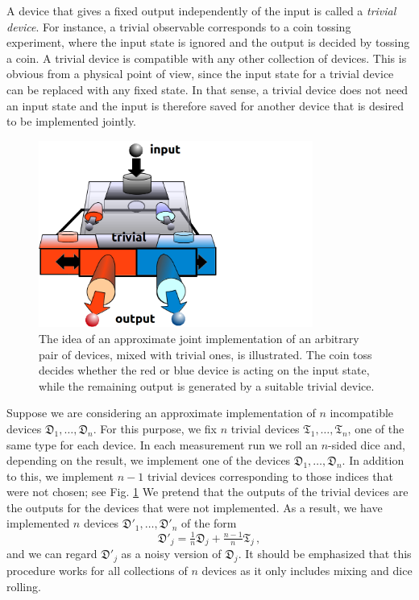 \documentclass[12pt]{iopart}
\theoremstyle{definition}
\newcommand{\Dev}{\mathfrak{D}} %
\newcommand{\Triv}{\mathfrak{T}} %
\begin{document}
A device that gives a fixed output independently of the input is called a \emph{trivial device}.
For instance, a trivial observable corresponds to a coin tossing experiment, where the input state is ignored and the output is decided by tossing a coin. 
A trivial device is compatible with any other collection of devices.
This is obvious from a physical point of view, since the input state for a trivial device can be replaced with any fixed state.
In that sense, a trivial device does not need an input state and the input is therefore saved for another device that is desired to be implemented jointly.

\begin{figure}\begin{center}
\includegraphics[width=9cm]{fig_incomp_trivimix.png}
\caption{
The idea of an approximate joint implementation of an arbitrary pair of devices, mixed with trivial ones, is illustrated. The coin toss decides whether the red or blue device is acting on the input state, while the remaining output is generated by a suitable trivial device. }
\label{fig:trivimix}
\end{center}
\end{figure}

Suppose we are considering an approximate implementation of $n$ incompatible devices $\Dev_1,\ldots,\Dev_n$.
For this purpose, we fix $n$ trivial devices $\Triv_1,\ldots,\Triv_n$, one of the same type for each device.
In each measurement run we roll an $n$-sided dice and, depending on the result, we implement one of the devices $\Dev_1,\ldots,\Dev_n$.
In addition to this, we implement $n-1$ trivial devices corresponding to those indices that were not chosen; see Fig. \ref{fig:trivimix}
We pretend that the outputs of the trivial devices are the outputs for the devices that were not implemented.
As a result, we have implemented $n$ devices $\Dev'_1,\ldots,\Dev'_n$ of the form
\begin{equation}\label{eq:mixtoss}
\Dev'_j = \tfrac{1}{n} \Dev_j + \tfrac{n-1}{n} \Triv_j \, ,
\end{equation}
and we can regard $\Dev'_j$ as a noisy version of $\Dev_j$.
It should be emphasized that this procedure works for all collections of $n$ devices as it only includes mixing and dice rolling.
\end{document}
